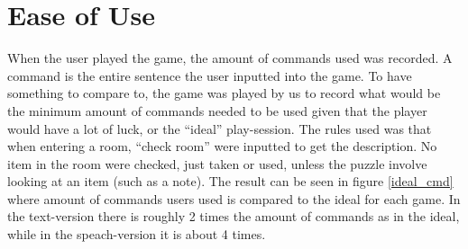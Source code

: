\section{Ease of Use}
When the user played the game, the amount of commands used was recorded. A command is the entire sentence the user inputted into the game. To have something to compare to, the game was played by us to record what would be the minimum amount of commands needed to be used given that the player would have a lot of luck, or the ``ideal'' play-session. The rules used was that when entering a room, ``check room'' were inputted to get the description. No item in the room were checked, just taken or used, unless the puzzle involve looking at an item (such as a note). The result can be seen in figure \ref{ideal_cmd} where amount of commands users used is compared to the ideal for each game. In the text-version there is roughly 2 times the amount of commands as in the ideal, while in the speach-version it is about 4 times.

